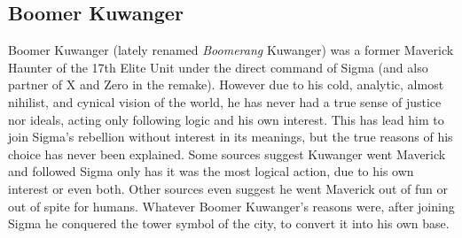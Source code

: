 \subsection{Boomer Kuwanger}\label{boss:Boomerang_Kuwanger}
Boomer Kuwanger (lately renamed \emph{Boomerang} Kuwanger) was a former Maverick Haunter of the 17th Elite Unit under the direct command of Sigma (and also partner of X and Zero in the \mhx remake). However due to his cold, analytic, almost nihilist\cite{book:MH_field_guide}, and cynical vision of the world, he has never had a true sense of justice nor ideals, acting only following logic and his own interest\cite{MHX:manual}. This has lead him to join Sigma's rebellion without interest in its meanings, but the true reasons of his choice has never been explained. Some sources suggest Kuwanger went Maverick and followed Sigma only has it was the most logical action\cite{MHX:manual}, due to his own interest\cite{wiki:Boomer_kuwanger} or even both\cite{book:MH_field_guide}. Other sources even suggest he went Maverick out of fun\cite{Xcoll1:Manual_X1} or out of spite for humans\cite{wayback:X_resources}. Whatever Boomer Kuwanger's reasons were, after joining Sigma he conquered the tower symbol of the city, to convert it into his own base.

